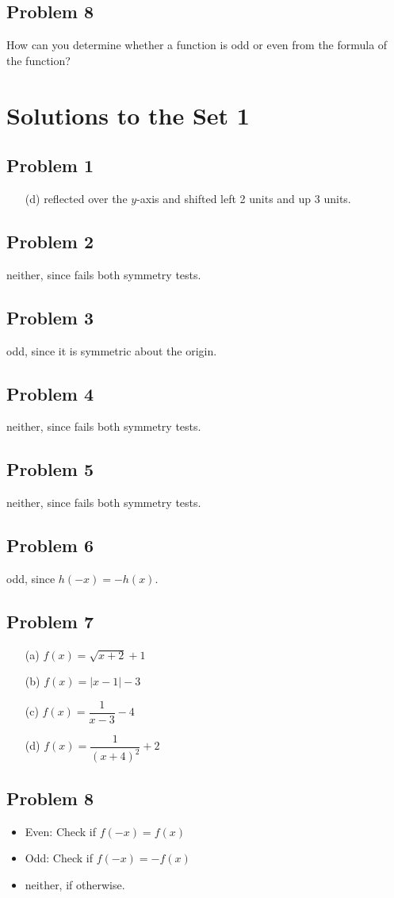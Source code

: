 \documentclass[12pt]{article}
\begin{document}
\subsection*{Problem 8}
How can you determine whether a function is odd or even from the formula of the function?

\newpage
\section*{Solutions to the Set 1}
\subsection*{Problem 1}
\begin{enumerate}
    \item[(d)] reflected over the \( y \)-axis and shifted left 2 units and up 3 units.
\end{enumerate}


\subsection*{Problem 2}
neither, since fails both symmetry tests.

\subsection*{Problem 3}
odd, since it is symmetric about the origin.

\subsection*{Problem 4}
neither, since fails both symmetry tests.

\subsection*{Problem 5}
neither, since fails both symmetry tests.

\subsection*{Problem 6}
odd, since \( h(-x) = -h(x) \).

\subsection*{Problem 7}
\begin{enumerate}
    \item[(a)] \( \boxed{f(x) = \sqrt{x + 2} + 1} \)
    \item[(b)] \( \boxed{f(x) = |x - 1| - 3} \)
    \item[(c)] \( \boxed{f(x) = \dfrac{1}{x - 3} - 4} \)
    \item[(d)] \( \boxed{f(x) = \dfrac{1}{(x + 4)^2} + 2} \)
\end{enumerate}

\subsection*{Problem 8}
\begin{itemize}
    \item Even: Check if \( f(-x) = f(x) \)
    \item Odd: Check if \( f(-x) = -f(x) \)
    \item neither, if otherwise.
\end{itemize}
\end{document}
